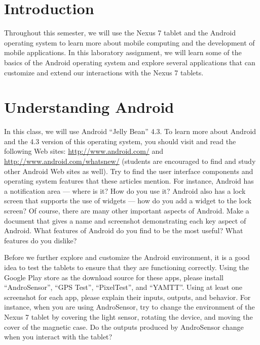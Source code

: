 

\usepackage[compact]{titlesec}



\section*{Introduction}

Throughout this semester, we will use the Nexus 7 tablet and the Android operating system to learn more about mobile
computing and the development of mobile applications.  In this laboratory assignment, we will learn some of the basics of
the Android operating system and explore several applications that can customize and extend our interactions with the
Nexus 7 tablets.

\section*{Understanding Android}

In this class, we will use Android ``Jelly Bean'' 4.3.  To learn more about Android and the 4.3 version of this
operating system, you should visit and read the following Web sites: \url{http://www.android.com/} and
\url{http://www.android.com/whatsnew/} (students are encouraged to find and study other Android Web sites as well). Try
to find the user interface components and operating system features that these articles mention.  For instance, Android
has a notification area --- where is it?  How do you use it? Android also has a lock screen that supports the use of
widgets --- how do you add a widget to the lock screen?  Of course, there are many other important aspects of Android.
Make a document that gives a name and screenshot demonstrating each key aspect of Android.  What features of Android do you
find to be the most useful?  What features do you dislike?

Before we further explore and customize the Android environment, it is a good idea to test the tablets to ensure that
they are functioning correctly.  Using the Google Play store as the download source for these apps, please install
``AndroSensor'', ``GPS Test'', ``PixelTest'', and ``YAMTT''.  Using at least one screenshot for each app, please explain
their inputs, outputs, and behavior.  For instance, when you are using AndroSensor, try to change the environment of
the Nexus 7 tablet by covering the light sensor, rotating the device, and moving the cover of the magnetic case.  Do the
outputs produced by AndroSensor change when you interact with the tablet?

